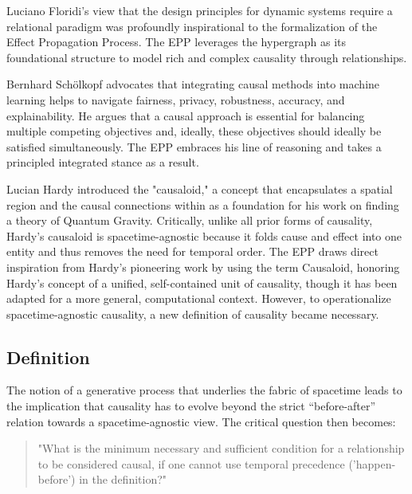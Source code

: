 Luciano Floridi's view\cite{floridi2025applied} that the design principles for  dynamic systems require a relational paradigm was profoundly inspirational to the formalization of the Effect Propagation Process. The EPP leverages the hypergraph as its foundational structure to model rich and complex causality through relationships. 

 Bernhard Schölkopf\cite{binkyte2025causalitykeyunderstandbalance} advocates that integrating causal methods into machine learning helps to navigate fairness, privacy, robustness, accuracy, and explainability. He argues that  a causal approach is essential for balancing multiple competing objectives and, ideally, these objectives should ideally be satisfied simultaneously. The EPP embraces his line of reasoning and takes a principled integrated stance as a result.  
 
Lucian Hardy introduced the "causaloid,"\cite{HardyDynamicCausalStructure} a concept that encapsulates a spatial region and the causal connections within as a foundation for his work on finding a theory of Quantum Gravity. Critically, unlike all prior forms of causality, Hardy's causaloid is spacetime-agnostic because it folds cause and effect into one entity and thus removes the need for temporal order. The EPP draws direct inspiration from Hardy’s pioneering work by using the term Causaloid, honoring Hardy's concept of a unified, self-contained unit of causality, though it has been adapted for a more general, computational context. However, to operationalize spacetime-agnostic causality, a new definition of causality became necessary. 

 
 \newpage
 
 
%
\subsection{Definition}
\label{sec:epp_definition}


The notion of a generative process that underlies the fabric of spacetime leads to the implication that causality has to evolve beyond the strict “before-after” relation towards a spacetime-agnostic view. The critical question then becomes:

\begin{quote}
	"What is the minimum necessary and sufficient condition for a relationship to be considered causal, 
	if one cannot use temporal precedence ('happen-before') in the definition?"
\end{quote}

